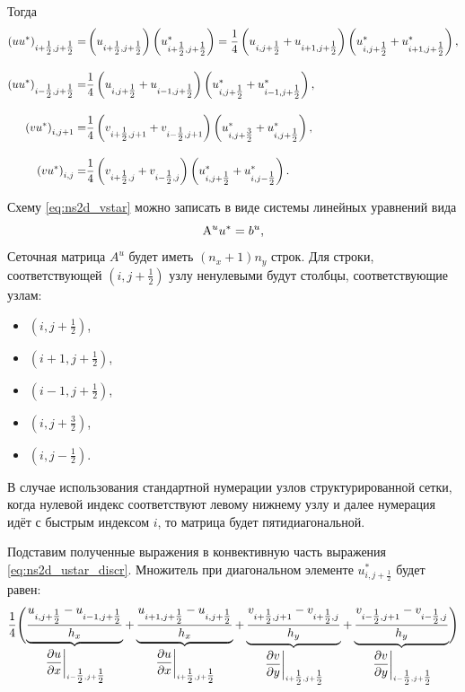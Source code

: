 Тогда
\begin{align*}
    \left(u u^*\right)_{i+\tfrac12,j+\tfrac12} =&
        \left(u_{i+\tfrac12,j+\tfrac12} \vphantom{u^*_{\tfrac12}}\right)\left(u^*_{i+\tfrac12,j+\tfrac12}\right) =
        \frac14 \left(u_{i, j+\tfrac12} + u_{i+1,j+\tfrac12}\vphantom{u^*_{\tfrac12}}\right)
                \left(u^*_{i, j+\tfrac12} + u^*_{i+1,j+\tfrac12}\right), \\[10pt]
    \left(u u^*\right)_{i-\tfrac12,j+\tfrac12} =&
        \frac14 \left(u_{i, j+\tfrac12} + u_{i-1,j+\tfrac12}\vphantom{u^*_{\tfrac12}}\right)
                \left(u^*_{i, j+\tfrac12} + u^*_{i-1,j+\tfrac12}\right), \\[10pt]
    \left(v u^*\right)_{i,j+1} =&
        \frac14 \left(v_{i+\tfrac12, j+1} + v_{i-\tfrac12,j+1}\vphantom{u^*_{\tfrac12}}\right)
                \left(u^*_{i, j+\tfrac32} + u^*_{i,j+\tfrac12}\right), \\[10pt]
    \left(v u^*\right)_{i,j} =&
        \frac14 \left(v_{i+\tfrac12, j} + v_{i-\tfrac12,j}\vphantom{u^*_{\tfrac12}}\right)
                \left(u^*_{i, j+\tfrac12} + u^*_{i,j-\tfrac12}\right).
\end{align*}

Схему \eqref{eq:ns2d_vstar}
можно записать в виде системы линейных уравнений вида
\begin{equation}
    \label{eq:ns2d_ustar_slae}
    {\rm A}^u u^* = b^{u},
\end{equation}
Сеточная матрица $A^u$ будет иметь $(n_x+1)n_y$ строк.
Для строки, соответствующей $\left(i,j+\tfrac12\right)$ узлу ненулевыми будут столбцы,
соответствующие узлам:
\begin{itemize}
\item $\left(i,j+\tfrac12\right)$,
\item $\left(i+1,j+\tfrac12\right)$,
\item $\left(i-1,j+\tfrac12\right)$,
\item $\left(i,j+\tfrac32\right)$,
\item $\left(i,j-\tfrac12\right)$.
\end{itemize}

В случае использования стандартной нумерации узлов структурированной сетки,
когда нулевой индекс соответствуют левому нижнему узлу и далее нумерация идёт
с быстрым индексом $i$, то матрица будет пятидиагональной.


Подставим полученные выражения в конвективную часть выражения \eqref{eq:ns2d_ustar_discr}.
Множитель при диагональном элементе $u^*_{i,j+\tfrac12}$ будет равен:
\begin{align*}
        \frac{1}{4}\Biggl(
         \underbrace{\frac{u_{i,j+\tfrac12} - u_{i-1,j+\tfrac12}}{h_x}}_{\left.\dfrac{\partial u}{\partial x}\right|_{i-\tfrac12,j+\tfrac12}}
        +\underbrace{\frac{u_{i+1,j+\tfrac12} - u_{i,j+\tfrac12}}{h_x}}_{\left.\dfrac{\partial u}{\partial x}\right|_{i+\tfrac12,j+\tfrac12}}
        +\underbrace{\frac{v_{i+\tfrac12,j+1} - v_{i+\tfrac12,j}}{h_y}}_{\left.\dfrac{\partial v}{\partial y}\right|_{i+\tfrac12,j+\tfrac12}}
        +\underbrace{\frac{v_{i-\tfrac12,j+1} - v_{i-\tfrac12,j}}{h_y}}_{\left.\dfrac{\partial v}{\partial y}\right|_{i-\tfrac12,j+\tfrac12}}
        \Biggr)
\end{align*}

